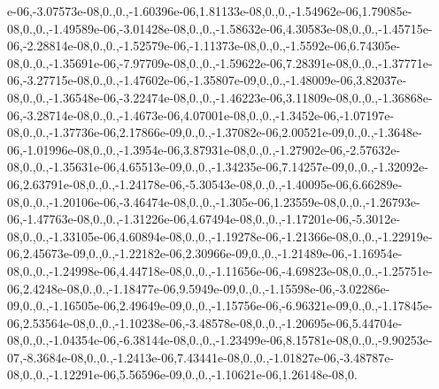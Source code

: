 \begin{DoxyCompactItemize}
e-\/06,-\/3.\-07573e-\/08,0.,0.,-\/1.\-60396e-\/06,1.\-81133e-\/08,0.,0.,-\/1.\-54962e-\/06,1.\-79085e-\/08,0.,0.,-\/1.\-49589e-\/06,-\/3.\-01428e-\/08,0.,0.,-\/1.\-58632e-\/06,4.\-30583e-\/08,0.,0.,-\/1.\-45715e-\/06,-\/2.\-28814e-\/08,0.,0.,-\/1.\-52579e-\/06,-\/1.\-11373e-\/08,0.,0.,-\/1.\-5592e-\/06,6.\-74305e-\/08,0.,0.,-\/1.\-35691e-\/06,-\/7.\-97709e-\/08,0.,0.,-\/1.\-59622e-\/06,7.\-28391e-\/08,0.,0.,-\/1.\-37771e-\/06,-\/3.\-27715e-\/08,0.,0.,-\/1.\-47602e-\/06,-\/1.\-35807e-\/09,0.,0.,-\/1.\-48009e-\/06,3.\-82037e-\/08,0.,0.,-\/1.\-36548e-\/06,-\/3.\-22474e-\/08,0.,0.,-\/1.\-46223e-\/06,3.\-11809e-\/08,0.,0.,-\/1.\-36868e-\/06,-\/3.\-28714e-\/08,0.,0.,-\/1.\-4673e-\/06,4.\-07001e-\/08,0.,0.,-\/1.\-3452e-\/06,-\/1.\-07197e-\/08,0.,0.,-\/1.\-37736e-\/06,2.\-17866e-\/09,0.,0.,-\/1.\-37082e-\/06,2.\-00521e-\/09,0.,0.,-\/1.\-3648e-\/06,-\/1.\-01996e-\/08,0.,0.,-\/1.\-3954e-\/06,3.\-87931e-\/08,0.,0.,-\/1.\-27902e-\/06,-\/2.\-57632e-\/08,0.,0.,-\/1.\-35631e-\/06,4.\-65513e-\/09,0.,0.,-\/1.\-34235e-\/06,7.\-14257e-\/09,0.,0.,-\/1.\-32092e-\/06,2.\-63791e-\/08,0.,0.,-\/1.\-24178e-\/06,-\/5.\-30543e-\/08,0.,0.,-\/1.\-40095e-\/06,6.\-66289e-\/08,0.,0.,-\/1.\-20106e-\/06,-\/3.\-46474e-\/08,0.,0.,-\/1.\-305e-\/06,1.\-23559e-\/08,0.,0.,-\/1.\-26793e-\/06,-\/1.\-47763e-\/08,0.,0.,-\/1.\-31226e-\/06,4.\-67494e-\/08,0.,0.,-\/1.\-17201e-\/06,-\/5.\-3012e-\/08,0.,0.,-\/1.\-33105e-\/06,4.\-60894e-\/08,0.,0.,-\/1.\-19278e-\/06,-\/1.\-21366e-\/08,0.,0.,-\/1.\-22919e-\/06,2.\-45673e-\/09,0.,0.,-\/1.\-22182e-\/06,2.\-30966e-\/09,0.,0.,-\/1.\-21489e-\/06,-\/1.\-16954e-\/08,0.,0.,-\/1.\-24998e-\/06,4.\-44718e-\/08,0.,0.,-\/1.\-11656e-\/06,-\/4.\-69823e-\/08,0.,0.,-\/1.\-25751e-\/06,2.\-4248e-\/08,0.,0.,-\/1.\-18477e-\/06,9.\-5949e-\/09,0.,0.,-\/1.\-15598e-\/06,-\/3.\-02286e-\/09,0.,0.,-\/1.\-16505e-\/06,2.\-49649e-\/09,0.,0.,-\/1.\-15756e-\/06,-\/6.\-96321e-\/09,0.,0.,-\/1.\-17845e-\/06,2.\-53564e-\/08,0.,0.,-\/1.\-10238e-\/06,-\/3.\-48578e-\/08,0.,0.,-\/1.\-20695e-\/06,5.\-44704e-\/08,0.,0.,-\/1.\-04354e-\/06,-\/6.\-38144e-\/08,0.,0.,-\/1.\-23499e-\/06,8.\-15781e-\/08,0.,0.,-\/9.\-90253e-\/07,-\/8.\-3684e-\/08,0.,0.,-\/1.\-2413e-\/06,7.\-43441e-\/08,0.,0.,-\/1.\-01827e-\/06,-\/3.\-48787e-\/08,0.,0.,-\/1.\-12291e-\/06,5.\-56596e-\/09,0.,0.,-\/1.\-10621e-\/06,1.\-26148e-\/08,0.\
\end{DoxyCompactItemize}
